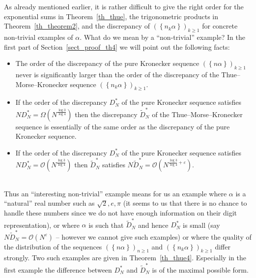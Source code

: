 \documentclass[12pt]{amsart}
\newcommand {\ve} {\varepsilon}
\begin{document}
As already mentioned earlier, it is rather difficult to give the right order for the exponential sums in Theorem~\ref{th_thue}, the trigonometric products in Theorem~\ref{th_theorem2}, and the discrepancy of $\left(\left\{n_{k} \alpha\right\}\right)_{k \geq 1}$ for concrete non-trivial examples of $\alpha$. What do we mean by a ``non-trivial'' example? In the first part of Section~\ref{sect_proof_th4} we will point out the following facts: 
\begin{itemize}
 \item The order of the discrepancy of the pure Kronecker sequence $\left(\left\{n \alpha\right\}\right)_{k \geq 1}$ never is significantly larger than the order of the  discrepancy of the Thue--Morse--Kronecker sequence $\left(\left\{n_{k} \alpha\right\}\right)_{k \geq 1}$.
 \item If the order of the discrepancy $D_{N}^{*}$ of the pure Kronecker sequence satisfies $N D_{N}^{*}= \Omega \left(N^{\frac{\log 3}{\log 4}}\right)$ then the discrepancy $\widetilde{D}_{N}^{*}$ of the Thue--Morse--Kronecker sequence is essentially of the same order as the discrepancy of the pure Kronecker sequence.
 \item If the order of the discrepancy $D_{N}^{*}$ of the pure Kronecker sequence satisfies $N D_{N}^{*} = \mathcal{O} \left(N^{\frac{\log 3}{\log 4}}\right)$ then $\widetilde{D}_{N}^{*}$ satisfies $N \widetilde{D}_{N}^{*} = \mathcal{O} \left(N^{\frac{\log 3}{\log 4} + \ve}\right)$.
\end{itemize}
~\\

Thus an ``interesting non-trivial'' example means for us an example where $\alpha$ is a ``natural'' real number such as $\sqrt{2}, e, \pi$ (it seems to us that there is no chance to handle these numbers since we do not have enough information on their digit representation), or where $\alpha$ is such that $\widetilde{D}_{N}^{*}$ and hence $D_{N}^{*}$ is small (say $N \widetilde{D}_{N}^{*} = \mathcal{O} \left(N^{\ve}\right)$ -- however we cannot give such examples) or where the quality of the distribution of the sequences $\left(\left\{n \alpha\right\}\right)_{n \geq 1}$ and $\left(\left\{n_{k} \alpha\right\}\right)_{k \geq 1}$ differ strongly. Two such examples are given in Theorem~\ref{th_thue4}. Especially in the first example the difference between $D_{N}^{*}$ and $\widetilde{D}_{N}^{*}$ is of the maximal possible form.\\
\end{document}
